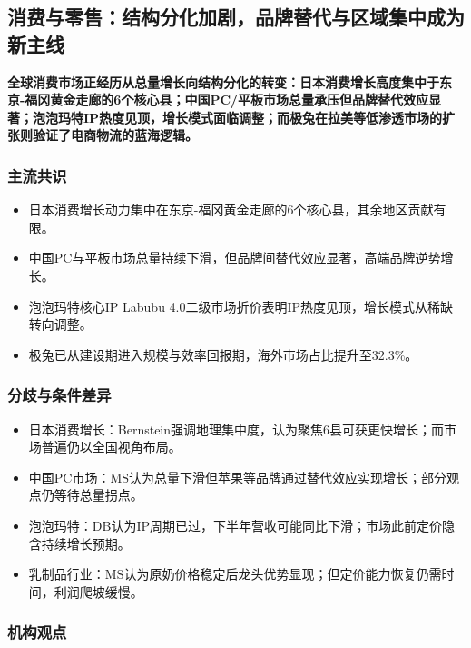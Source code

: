\documentclass[11pt]{ctexart}
\begin{document}
\subsection{消费与零售：结构分化加剧，品牌替代与区域集中成为新主线}
\textbf{全球消费市场正经历从总量增长向结构分化的转变：日本消费增长高度集中于东京-福冈黄金走廊的6个核心县；中国PC/平板市场总量承压但品牌替代效应显著；泡泡玛特IP热度见顶，增长模式面临调整；而极兔在拉美等低渗透市场的扩张则验证了电商物流的蓝海逻辑。}
\subsubsection*{主流共识}
\begin{itemize}
  \item 日本消费增长动力集中在东京-福冈黄金走廊的6个核心县，其余地区贡献有限。
  \item 中国PC与平板市场总量持续下滑，但品牌间替代效应显著，高端品牌逆势增长。
  \item 泡泡玛特核心IP Labubu 4.0二级市场折价表明IP热度见顶，增长模式从稀缺转向调整。
  \item 极兔已从建设期进入规模与效率回报期，海外市场占比提升至32.3\%。
\end{itemize}
\subsubsection*{分歧与条件差异}
\begin{itemize}
  \item 日本消费增长：Bernstein强调地理集中度，认为聚焦6县可获更快增长；而市场普遍仍以全国视角布局。
  \item 中国PC市场：MS认为总量下滑但苹果等品牌通过替代效应实现增长；部分观点仍等待总量拐点。
  \item 泡泡玛特：DB认为IP周期已过，下半年营收可能同比下滑；市场此前定价隐含持续增长预期。
  \item 乳制品行业：MS认为原奶价格稳定后龙头优势显现；但定价能力恢复仍需时间，利润爬坡缓慢。
\end{itemize}
\subsubsection*{机构观点}
\end{document}
